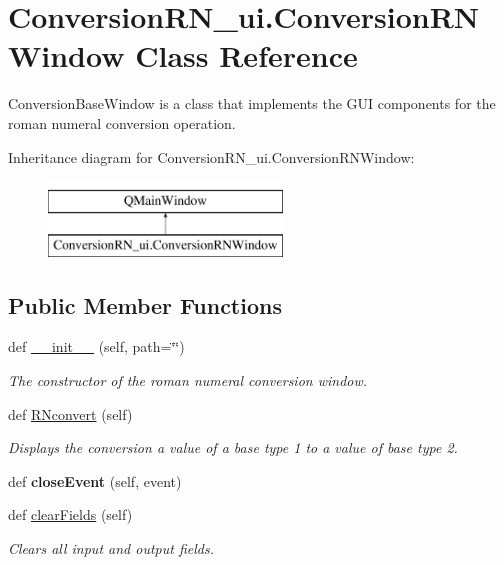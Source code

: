 \hypertarget{class_conversion_r_n__ui_1_1_conversion_r_n_window}{}\section{Conversion\+R\+N\+\_\+ui.\+Conversion\+R\+N\+Window Class Reference}
\label{class_conversion_r_n__ui_1_1_conversion_r_n_window}


Conversion\+Base\+Window is a class that implements the G\+UI components for the roman numeral conversion operation.  


Inheritance diagram for Conversion\+R\+N\+\_\+ui.\+Conversion\+R\+N\+Window\+:\begin{figure}[H]
\begin{center}
\leavevmode
\includegraphics[height=2.000000cm]{class_conversion_r_n__ui_1_1_conversion_r_n_window}
\end{center}
\end{figure}
\subsection*{Public Member Functions}
\begin{DoxyCompactItemize}
\item 
def \hyperlink{class_conversion_r_n__ui_1_1_conversion_r_n_window_aa4752dfe8364faa4649c2c19ff55fba6}{\+\_\+\+\_\+init\+\_\+\+\_\+} (self, path=\char`\"{}\char`\"{})
\begin{DoxyCompactList}\small\item\em The constructor of the roman numeral conversion window. \end{DoxyCompactList}\item 
def \hyperlink{class_conversion_r_n__ui_1_1_conversion_r_n_window_a0c015e92809a27ecde70f4b62e102da4}{R\+Nconvert} (self)
\begin{DoxyCompactList}\small\item\em Displays the conversion a value of a base type 1 to a value of base type 2. \end{DoxyCompactList}\item 
\mbox{\label{class_conversion_r_n__ui_1_1_conversion_r_n_window_ad549ca41960f8912ab9d0aaab6f2907a}} 
def {\bfseries close\+Event} (self, event)
\item 
\mbox{\label{class_conversion_r_n__ui_1_1_conversion_r_n_window_af8e5ceb020d2ecb1b914586da5729b07}} 
def \hyperlink{class_conversion_r_n__ui_1_1_conversion_r_n_window_af8e5ceb020d2ecb1b914586da5729b07}{clear\+Fields} (self)
\begin{DoxyCompactList}\small\item\em Clears all input and output fields. \end{DoxyCompactList}\end{DoxyCompactItemize}
